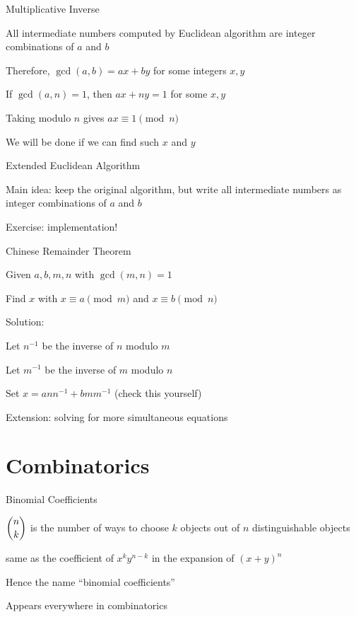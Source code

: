 \documentclass[13pt,onlymath]{beamer}
\begin{document}
\begin{frame}{Multiplicative Inverse}
\BIT
\item All intermediate numbers computed by Euclidean algorithm are integer combinations of $a$ and $b$
\BIT
\item Therefore, $\gcd(a, b) = ax+by$ for some integers $x, y$
\item If $\gcd(a, n) = 1$, then $ax + ny = 1$ for some $x, y$
\item Taking modulo $n$ gives $ax \equiv 1 \pmod{n}$
\EIT
\item We will be done if we can find such $x$ and $y$
\EIT
\end{frame}

\begin{frame}{Extended Euclidean Algorithm}
\BIT
\item Main idea: keep the original algorithm, but write all intermediate numbers as integer combinations of $a$ and $b$
\item Exercise: implementation!
\EIT
\end{frame}

\begin{frame}{Chinese Remainder Theorem}
\BIT
\item Given $a,b,m,n$ with $\gcd(m, n) = 1$
\item Find $x$ with $x\equiv a \pmod{m}$ and $x \equiv b \pmod{n}$

\item Solution:
\BIT
\item Let $n^{-1}$ be the inverse of $n$ modulo $m$
\item Let $m^{-1}$ be the inverse of $m$ modulo $n$
\item Set $x = a n n^{-1} + b m m^{-1}$ (check this yourself)
\EIT
\item Extension: solving for more simultaneous equations
\EIT
\end{frame}

\section{Combinatorics}

\begin{frame}{Binomial Coefficients}
\BIT
\item $\dbinom{n}{k}$ is the number of ways to choose $k$ objects out of $n$ distinguishable objects
\item same as the coefficient of $x^k y^{n-k}$ in the expansion of $(x+y)^n$
\BIT
\item Hence the name ``binomial coefficients''
\EIT
\item Appears everywhere in combinatorics
\EIT
\end{frame}
\end{document}
